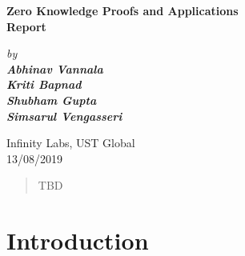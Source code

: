 \documentclass[12pt]{article}
\theoremstyle{definition}
\theoremstyle{remark}
\theoremstyle{definition}
\begin{document}
\begin{titlepage}
\thispagestyle{empty}
\vspace*{0.7cm}
{\centering
\large
{ \Large\bf \textbf{Zero Knowledge Proofs and Applications}}\\
\vspace{2cm}
\bf{Report}\\
\vspace{0.25cm}
\vspace{0.1cm}

\it
by \\
\vspace{.5cm}
\rm
{\large \bf {Abhinav Vannala}}\\
{\large \bf {Kriti Bapnad}}\\
{\large \bf {Shubham Gupta}}\\
{\large \bf {Simsarul Vengasseri}}\\


\vspace{5cm}


\vspace{1cm}
Infinity Labs, UST Global\\\Large{13/08/2019}\\
}

\pagebreak
\end{titlepage}




\newpage
\begin{abstract}
TBD
\end{abstract}

\newpage
\tableofcontents

\newpage
\section{Introduction}
\end{document}
